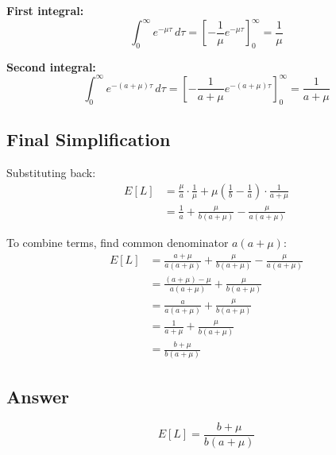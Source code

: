 \documentclass[11pt]{article}
\begin{document}
\textbf{First integral:}
\[
\int_0^\infty e^{-\mu\tau} \, d\tau = \left[-\frac{1}{\mu}e^{-\mu\tau}\right]_0^\infty = \frac{1}{\mu}
\]

\textbf{Second integral:}
\[
\int_0^\infty e^{-(a+\mu)\tau} \, d\tau = \left[-\frac{1}{a+\mu}e^{-(a+\mu)\tau}\right]_0^\infty = \frac{1}{a+\mu}
\]

\subsection*{Final Simplification}

Substituting back:
\begin{align*}
E[L] &= \frac{\mu}{a} \cdot \frac{1}{\mu} + \mu\left(\frac{1}{b} - \frac{1}{a}\right) \cdot \frac{1}{a+\mu} \\
&= \frac{1}{a} + \frac{\mu}{b(a+\mu)} - \frac{\mu}{a(a+\mu)}
\end{align*}

To combine terms, find common denominator $a(a+\mu)$:
\begin{align*}
E[L] &= \frac{a+\mu}{a(a+\mu)} + \frac{\mu}{b(a+\mu)} - \frac{\mu}{a(a+\mu)} \\
&= \frac{(a+\mu) - \mu}{a(a+\mu)} + \frac{\mu}{b(a+\mu)} \\
&= \frac{a}{a(a+\mu)} + \frac{\mu}{b(a+\mu)} \\
&= \frac{1}{a+\mu} + \frac{\mu}{b(a+\mu)} \\
&= \frac{b + \mu}{b(a+\mu)}
\end{align*}

\subsection*{Answer}
\[
\boxed{E[L] = \frac{b + \mu}{b(a + \mu)}}
\]
\end{document}

